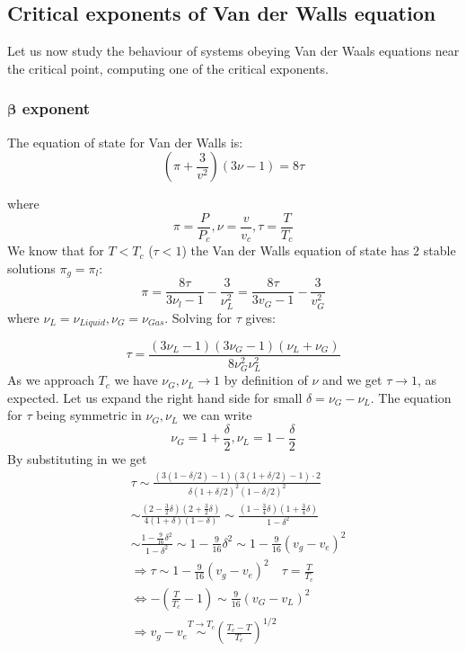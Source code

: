 \documentclass[../../Main/Main.tex]{subfiles}
\begin{document}
\clearpage


\subsection{Critical exponents of Van der Walls equation}
Let us now study the behaviour of systems obeying Van der Waals equations near the critical point, computing one of the critical exponents.

\subsubsection{\( \pmb{\beta}  \) exponent}
The equation of state for Van der Walls is:
$$\left( \pi + \frac{3}{v^{2}} \right)(3\nu-1)= 8\tau$$

where
$$\pi = \frac{P}{P_{c}}, \nu = \frac{v}{v_{c}},\tau = \frac{T}{T_{c}}$$
We know that for $T < T_{c}$ ($\tau <1$) the Van der Walls equation of state has 2 stable solutions $\pi_{g} = \pi_{l}$:
$$\pi = \frac{8\tau}{3\nu_{l} - 1} - \frac{3}{\nu_{L}^{2}} = \frac{8\tau}{3v_{G}-1} - \frac{3}{v_{G}^{2}}$$
where $\nu_{L} = \nu_{Liquid}, \nu_{G}=\nu_{Gas}$.
Solving for $\tau$ gives:

$$\tau = \frac{(3\nu_{L}-1)(3\nu_{G} - 1)(\nu_{L} + \nu_{G})}{8\nu_{G}^{2}\nu_{L}^{2}}$$
As we approach $T_{c}$ we have $\nu_{G}, \nu_{L} \to 1$ by definition of $\nu$ and we get $\tau \to 1$, as expected.
Let us expand the right hand side for small $\delta = \nu_{G} - \nu_{L}$.
The equation for $\tau$ being symmetric in $\nu_{G},\nu_{L}$ we can write 
$$\nu_{G} = 1 + \frac{\delta}{2}, \nu_{L} = 1 - \frac{\delta}{2}$$
By substituting in we get
$$
\begin{aligned}
& \tau \sim \frac{(3(1-\delta / 2)-1)(3(1+\delta / 2)-1) \cdot 2}{\delta(1+\delta / 2)^2(1-\delta / 2)^2} \\
& \sim \frac{\left(2-\frac{3}{2} \delta\right)\left(2+\frac{3}{2} \delta\right)}{4(1+\delta)(1-\delta)} \sim \frac{\left(1-\frac{3}{4} \delta\right)\left(1+\frac{3}{4} \delta\right)}{1-\delta^2} \\
& \sim \frac{1-\frac{9}{16} \delta^2}{1-\delta^2} \sim1-\frac{9}{16} \delta^2 \sim 1-\frac{9}{16}\left(v_g-v_e\right)^2 \\
& \Rightarrow \tau \sim 1-\frac{9}{16}\left(v_g-v_e\right)^2 \quad \tau=\frac{T}{T_c} \\
& \Leftrightarrow - \left( \frac{T}{T_{c}} - 1 \right) \sim \frac{9}{16}(v_{G} - v_{L})^{2 }\\
& \Rightarrow v_g-v_e \stackrel{T \rightarrow T_c}{\sim}\left(\frac{T_c-T}{T_c}\right)^{1 / 2}
\end{aligned}
$$
\end{document}
